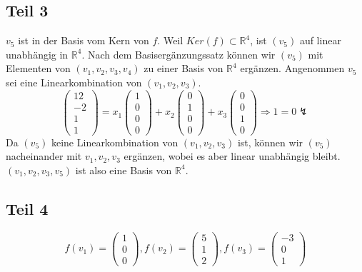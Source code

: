 \documentclass[a4paper,10pt]{article}
\begin{document}
\subsection*{Teil 3}

$v_5$ ist in der Basis vom Kern von $f$.
Weil $Ker(f) \subset \mathbb{R}^4$, ist $(v_5)$ auf linear unabhängig in $\mathbb{R}^4$.
Nach dem Basisergänzungssatz können wir $(v_5)$ mit Elementen von $(v_1, v_2, v_3, v_4)$ zu einer Basis von $\mathbb{R}^4$ ergänzen.
Angenommen $v_5$ sei eine Linearkombination von $(v_1, v_2, v_3)$.
\begin{equation}
 \begin{pmatrix}12\\-2\\1\\1\end{pmatrix} = x_1\begin{pmatrix}1\\0\\0\\0\end{pmatrix} + x_2\begin{pmatrix}0\\1\\0\\0\end{pmatrix} + x_3\begin{pmatrix}0\\0\\1\\0\end{pmatrix}
 \Rightarrow 1 = 0 \lightning
\end{equation}
Da $(v_5)$ keine Linearkombination von $(v_1, v_2, v_3)$ ist, können wir $(v_5)$ nacheinander mit $v_1, v_2, v_3$ ergänzen, wobei es aber linear unabhängig bleibt.
$(v_1, v_2, v_3, v_5)$ ist also eine Basis von $\mathbb{R}^4$.

\subsection*{Teil 4}

\begin{equation}
 f(v_1) = \begin{pmatrix}1\\0\\0\end{pmatrix},
 f(v_2) = \begin{pmatrix}5\\1\\2\end{pmatrix},
 f(v_3) = \begin{pmatrix}-3\\0\\1\end{pmatrix}
\end{equation}
\end{document}
